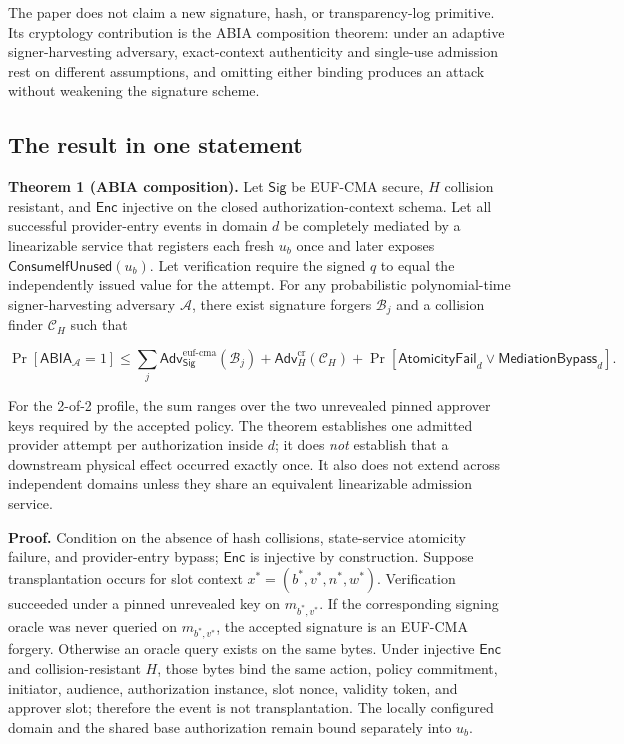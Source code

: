 \documentclass[11pt]{article}
\begin{document}
The paper does not claim a new signature, hash, or transparency-log primitive.
Its cryptology contribution is the ABIA composition theorem: under an adaptive
signer-harvesting adversary, exact-context authenticity and single-use admission
rest on different assumptions, and omitting either binding produces an attack
without weakening the signature scheme.

\subsection{The result in one statement}

\textbf{Theorem 1 (ABIA composition).} Let $\mathsf{Sig}$ be EUF-CMA secure,
$H$ collision resistant, and $\mathsf{Enc}$ injective on the closed
authorization-context schema. Let all successful provider-entry events in
domain $d$ be completely mediated by a linearizable service that registers
each fresh $u_b$ once and later exposes $\mathsf{ConsumeIfUnused}(u_b)$. Let
verification require the signed $q$ to equal the independently issued value
for the attempt. For any probabilistic
polynomial-time signer-harvesting adversary $\mathcal{A}$, there exist signature
forgers $\mathcal{B}_j$ and a collision finder $\mathcal{C}_H$ such that

\[
\Pr[\mathsf{ABIA}_{\mathcal{A}}=1] \leq
\sum_j \mathsf{Adv}^{\mathrm{euf\mbox{-}cma}}_{\mathsf{Sig}}(\mathcal{B}_j)
+ \mathsf{Adv}^{\mathrm{cr}}_H(\mathcal{C}_H)
+ \Pr[\mathsf{AtomicityFail}_d \lor \mathsf{MediationBypass}_d].
\]

For the 2-of-2 profile, the sum ranges over the two unrevealed pinned approver
keys required by the accepted policy. The theorem establishes one admitted
provider attempt per authorization inside $d$; it does \emph{not} establish
that a downstream physical effect occurred exactly once. It also does not
extend across independent domains unless they share an equivalent linearizable
admission service.

\textbf{Proof.} Condition on the absence of hash collisions, state-service
atomicity failure, and provider-entry bypass; $\mathsf{Enc}$ is injective by
construction. Suppose transplantation occurs for slot context
$x^*=(b^*,v^*,n^*,w^*)$. Verification succeeded under a pinned unrevealed key on
$m_{b^*,v^*}$. If the corresponding signing oracle was never queried on
$m_{b^*,v^*}$, the accepted signature is an EUF-CMA forgery. Otherwise an
oracle query exists on the same bytes. Under injective $\mathsf{Enc}$ and
collision-resistant $H$, those bytes bind the same action, policy commitment,
initiator, audience, authorization instance, slot nonce, validity token, and
approver slot; therefore the
event is not transplantation. The locally configured domain and the shared
base authorization remain bound separately into $u_b$.
\end{document}

